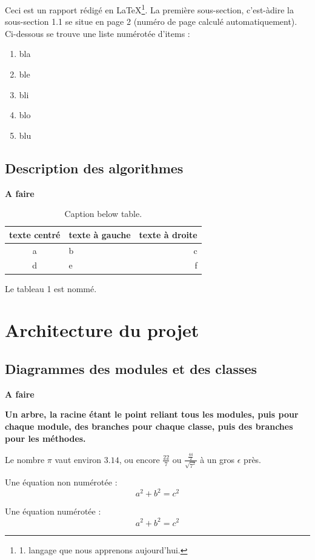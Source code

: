 \documentclass[12pt]{article}
\begin{document}
Ceci est un rapport rédigé en LaTeX\footnote{1. langage que nous apprenons aujourd'hui.}. La première sous-section, c'est-àdire la sous-section 1.1 se situe en page 2 (numéro de page calculé automatiquement). Ci-dessous se trouve une liste numérotée d'items :
\begin{enumerate}
  \item bla
  \item ble
  \item bli
  \item blo
  \item blu
\end{enumerate}
\subsection{Description des algorithmes}
\textbf{A faire}

 \begin{table}[htp]
	\centering
		\begin{tabular}{|c|l|r|}
  		\hline
  		texte centré & texte à gauche & texte à droite \\
  		\hline
  		a & b & c \\
  		\hline
  		d & e & f \\
  		\hline
		\end{tabular}
	\caption{Caption below table.}
\end{table}

Le tableau 1 est nommé.
\section{Architecture du projet}
\subsection{Diagrammes des modules et des classes}
\textbf{A faire}

\textbf{Un arbre, la racine étant le point reliant tous les modules, puis pour chaque module, des branches pour chaque classe, puis des branches pour les méthodes.}

Le nombre $\pi$ vaut environ $3.14$, ou encore $\frac{22}{7}$ ou $\frac{\frac{44}{2}}{\sqrt{7^2}}$ à un gros $\epsilon$ près.
\newline 

Une équation non numérotée :
$$ a^2 + b^2 = c^2$$
\newline 

Une équation numérotée :
\begin{equation}
a^2 + b^2 = c^2
\end{equation}
\end{document}
